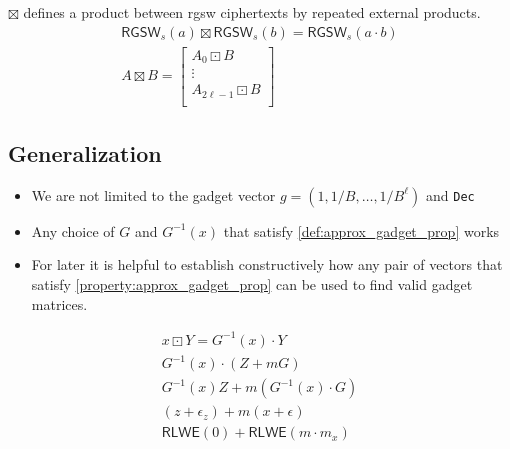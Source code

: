 \begin{definition} $\boxtimes$ defines a product between \gls{rgsw} ciphertexts by repeated external products.
\begin{gather}
    \label{def:internal_product}
    \mathsf{RGSW}_s(a) \boxtimes \mathsf{RGSW}_s(b) = \mathsf{RGSW}_s(a\cdot b) \\
    A \boxtimes B = 
    \begin{bmatrix}
        A_0 \boxdot B \\
        \vdots \\
        A_{2\ell - 1} \boxdot B \\    
    \end{bmatrix} 
\end{gather}
\end{definition}



\subsection{Generalization}
\begin{itemize}
    \item We are not limited to the gadget vector $g = (1, 1/B, \dots, 1/B^{\ell})$ and \texttt{Dec}
    \item Any choice of $G$ and $G^{-1}(x)$ that satisfy \eqref{def:approx_gadget_prop} works
    \item For later it is helpful to establish constructively how any pair of vectors that satisfy \eqref{property:approx_gadget_prop} can be used to find valid gadget matrices.
\end{itemize}

\ifnotes
\begin{gather}
    x\boxdot Y = G^{-1}(x)\cdot Y \\
    G^{-1}(x)\cdot (Z + mG) \\
    G^{-1}(x)Z + m(G^{-1}(x)\cdot G) \\
    (z + \epsilon_z) + m(x + \epsilon) \\
    \mathsf{RLWE}(0) + \mathsf{RLWE}(m\cdot m_x)
\end{gather}
\fi

